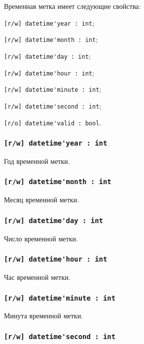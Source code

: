 Временная метка имеет следующие свойства:
\begin{icItems}
	\item \lstinline|[r/w] datetime'year : int|;
	\item \lstinline|[r/w] datetime'month : int|;
	\item \lstinline|[r/w] datetime'day : int|;
	\item \lstinline|[r/w] datetime'hour : int|;
	\item \lstinline|[r/w] datetime'minute : int|;
	\item \lstinline|[r/w] datetime'second : int|;
	\item \lstinline|[r/o] datetime'valid : bool|.
\end{icItems}

\subsubsection{\lstinline|[r/w] datetime'year : int|}

Год временной метки.

\subsubsection{\lstinline|[r/w] datetime'month : int|}

Месяц временной метки.

\subsubsection{\lstinline|[r/w] datetime'day : int|}

Число временной метки.

\subsubsection{\lstinline|[r/w] datetime'hour : int|}

Час временной метки.

\subsubsection{\lstinline|[r/w] datetime'minute : int|}

Минута временной метки.

\subsubsection{\lstinline|[r/w] datetime'second : int|}

